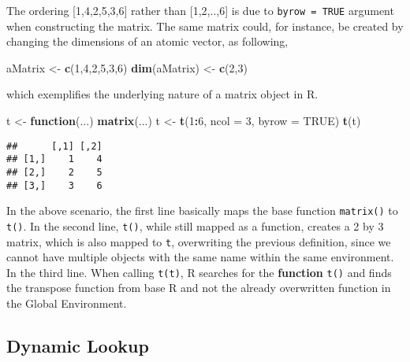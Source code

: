 \documentclass[12,]{article}
\newenvironment{Shaded}{\begin{snugshade}}{\end{snugshade}}
\newcommand{\KeywordTok}[1]{\textcolor[rgb]{0.13,0.29,0.53}{\textbf{#1}}}
\newcommand{\DataTypeTok}[1]{\textcolor[rgb]{0.13,0.29,0.53}{#1}}
\newcommand{\DecValTok}[1]{\textcolor[rgb]{0.00,0.00,0.81}{#1}}
\newcommand{\StringTok}[1]{\textcolor[rgb]{0.31,0.60,0.02}{#1}}
\newcommand{\OtherTok}[1]{\textcolor[rgb]{0.56,0.35,0.01}{#1}}
\newcommand{\ControlFlowTok}[1]{\textcolor[rgb]{0.13,0.29,0.53}{\textbf{#1}}}
\newcommand{\OperatorTok}[1]{\textcolor[rgb]{0.81,0.36,0.00}{\textbf{#1}}}
\newcommand{\NormalTok}[1]{#1}
\begin{document}
The ordering {[}1,4,2,5,3,6{]} rather than {[}1,2,..,6{]} is due to
\texttt{byrow\ =\ TRUE} argument when constructing the matrix. The same
matrix could, for instance, be created by changing the dimensions of an
atomic vector, as following,

\begin{Shaded}
\begin{Highlighting}[]
\NormalTok{aMatrix <-}\StringTok{ }\KeywordTok{c}\NormalTok{(}\DecValTok{1}\NormalTok{,}\DecValTok{4}\NormalTok{,}\DecValTok{2}\NormalTok{,}\DecValTok{5}\NormalTok{,}\DecValTok{3}\NormalTok{,}\DecValTok{6}\NormalTok{)}
\KeywordTok{dim}\NormalTok{(aMatrix) <-}\StringTok{ }\KeywordTok{c}\NormalTok{(}\DecValTok{2}\NormalTok{,}\DecValTok{3}\NormalTok{)}
\end{Highlighting}
\end{Shaded}

which exemplifies the underlying nature of a matrix object in R.

\begin{Shaded}
\begin{Highlighting}[]
\NormalTok{t <-}\StringTok{ }\ControlFlowTok{function}\NormalTok{(...) }\KeywordTok{matrix}\NormalTok{(...)}
\NormalTok{t <-}\StringTok{ }\KeywordTok{t}\NormalTok{(}\DecValTok{1}\OperatorTok{:}\DecValTok{6}\NormalTok{, }\DataTypeTok{ncol =} \DecValTok{3}\NormalTok{, }\DataTypeTok{byrow =} \OtherTok{TRUE}\NormalTok{) }
\KeywordTok{t}\NormalTok{(t)}
\end{Highlighting}
\end{Shaded}

\begin{verbatim}
##      [,1] [,2]
## [1,]    1    4
## [2,]    2    5
## [3,]    3    6
\end{verbatim}

In the above scenario, the first line basically maps the base function
\texttt{matrix()} to \texttt{t()}. In the second line, \texttt{t()},
while still mapped as a function, creates a 2 by 3 matrix, which is also
mapped to \texttt{t}, overwriting the previous definition, since we
cannot have multiple objects with the same name within the same
environment. In the third line. When calling \texttt{t(t)}, R searches
for the \textbf{function} \texttt{t()} and finds the transpose function
from base R and not the already overwritten function in the Global
Environment.

\subsection*{Dynamic Lookup}\label{dynamic-lookup}
\end{document}
